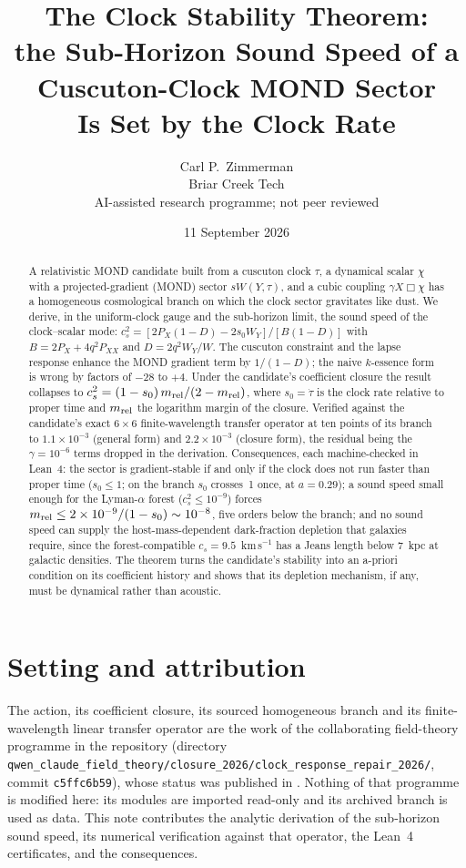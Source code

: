\documentclass[11pt,letterpaper]{article}
\title{The Clock Stability Theorem:\\ the Sub-Horizon Sound Speed of a Cuscuton-Clock MOND Sector\\ Is Set by the Clock Rate}
\author{Carl P.\ Zimmerman\\ \small Briar Creek Tech\\ \small AI-assisted research programme; not peer reviewed}
\date{11 September 2026}
\begin{document}
\maketitle
\begin{abstract}
A relativistic MOND candidate built from a cuscuton clock $\tau$, a dynamical scalar $\chi$ with a projected-gradient (MOND) sector $sW(Y,\tau)$, and a cubic coupling $\gamma X\Box\chi$ has a homogeneous cosmological branch on which the clock sector gravitates like dust. We derive, in the uniform-clock gauge and the sub-horizon limit, the sound speed of the clock--scalar mode: $c_s^2=[2P_X(1-D)-2s_0W_Y]/[B(1-D)]$ with $B=2P_X+4q^2P_{XX}$ and $D=2q^2W_Y/W$. The cuscuton constraint and the lapse response enhance the MOND gradient term by $1/(1-D)$; the naive $k$-essence form is wrong by factors of $-28$ to $+4$. Under the candidate's coefficient closure the result collapses to $c_s^2=(1-s_0)\,m_{\rm rel}/(2-m_{\rm rel})$, where $s_0=\dot\tau$ is the clock rate relative to proper time and $m_{\rm rel}$ the logarithm margin of the closure. Verified against the candidate's exact $6\times6$ finite-wavelength transfer operator at ten points of its branch to $1.1\times10^{-3}$ (general form) and $2.2\times10^{-3}$ (closure form), the residual being the $\gamma=10^{-6}$ terms dropped in the derivation. Consequences, each machine-checked in Lean~4: the sector is gradient-stable if and only if the clock does not run faster than proper time ($s_0\le1$; on the branch $s_0$ crosses~1 once, at $a=0.29$); a sound speed small enough for the Lyman-$\alpha$ forest ($c_s^2\le10^{-9}$) forces $m_{\rm rel}\le2\times10^{-9}/(1-s_0)\sim10^{-8}$, five orders below the branch; and no sound speed can supply the host-mass-dependent dark-fraction depletion that galaxies require, since the forest-compatible $c_s=9.5$~km\,s$^{-1}$ has a Jeans length below 7~kpc at galactic densities. The theorem turns the candidate's stability into an a-priori condition on its coefficient history and shows that its depletion mechanism, if any, must be dynamical rather than acoustic.
\end{abstract}

\section{Setting and attribution}
The action, its coefficient closure, its sourced homogeneous branch and its finite-wavelength linear transfer operator are the work of the collaborating field-theory programme in the repository \cite{repo} (directory \texttt{qwen\_claude\_field\_theory/closure\_2026/clock\_response\_repair\_2026/}, commit \texttt{c5ffc6b59}), whose status was published in \cite{paper13}. Nothing of that programme is modified here: its modules are imported read-only and its archived branch is used as data. This note contributes the analytic derivation of the sub-horizon sound speed, its numerical verification against that operator, the Lean~4 certificates, and the consequences.
\end{document}
